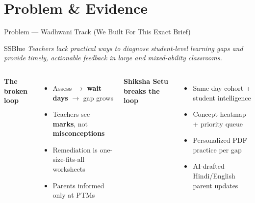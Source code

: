 \documentclass[aspectratio=169,10pt]{beamer}
\begin{document}
\section{Problem \& Evidence}

\begin{frame}{Problem — Wadhwani Track (We Built For This Exact Brief)}
  \begin{callout}[title={Official Challenge — Our North Star}]{SSBlue}
    \small\textit{Teachers lack practical ways to diagnose student-level learning gaps and provide timely, actionable feedback in large and mixed-ability classrooms.}
  \end{callout}

  \vspace{0.2cm}
  \begin{columns}[T]
    \textbf{\color{SSRed}The broken loop}
    \begin{itemize}\footnotesize
      \item Assess $\rightarrow$ \textbf{wait days} $\rightarrow$ gap grows
      \item Teachers see \textbf{marks}, not \textbf{misconceptions}
      \item Remediation is one-size-fits-all worksheets
      \item Parents informed only at PTMs
    \end{itemize}

    \textbf{\color{SSGreen}Shiksha Setu breaks the loop}
    \begin{itemize}\footnotesize
      \item Same-day cohort + student intelligence
      \item Concept heatmap + priority queue
      \item Personalized PDF practice per gap
      \item AI-drafted Hindi/English parent updates
    \end{itemize}
  \end{columns}

  \centering\vspace{0.25cm}
\end{frame}
\end{document}
